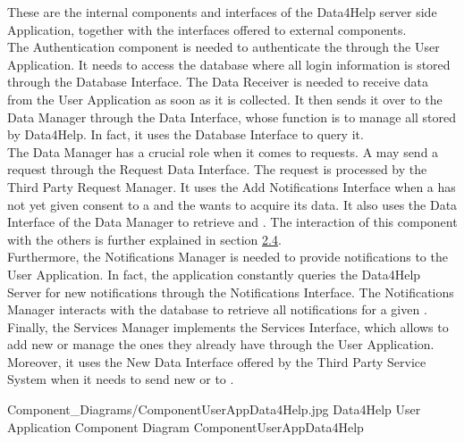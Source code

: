 \documentclass[../../DD.tex]{subfiles}
\begin{document}
	These are the internal components and interfaces of the Data4Help server side Application, together with the interfaces offered to external components.\\
	The Authentication component is needed to authenticate the  through the User Application. It needs to access the database where all login information is stored through the Database Interface.
	The Data Receiver is needed to receive data from the User Application as soon as it is collected. It then sends it over to the Data Manager through the Data Interface, whose function is to manage all  stored by Data4Help. In fact, it uses the Database Interface to query it.\\
	The Data Manager has a crucial role when it comes to  requests. A  may send a request through the Request Data Interface. The request is processed by the Third Party Request Manager. It uses the Add Notifications Interface when a  has not yet given consent to a  and the  wants to acquire its data. It also uses the Data Interface of the Data Manager to retrieve  and . The interaction of this component with the others is further explained in section \hyperref[sect:2.4]{2.4}.\\
	Furthermore, the Notifications Manager is needed to provide notifications to the User Application. In fact, the application constantly queries the Data4Help Server for new notifications through the Notifications Interface. The Notifications Manager interacts with the database to retrieve all notifications for a given .\\
	Finally, the Services Manager implements the Services Interface, which allows  to add new  or manage the ones they already have through the User Application. Moreover, it uses the New Data Interface offered by the Third Party Service System when it needs to send new  or  to .

	\image {13cm} {Component_Diagrams/ComponentUserAppData4Help.jpg} {Data4Help User Application Component Diagram} {ComponentUserAppData4Help}
\end{document}
